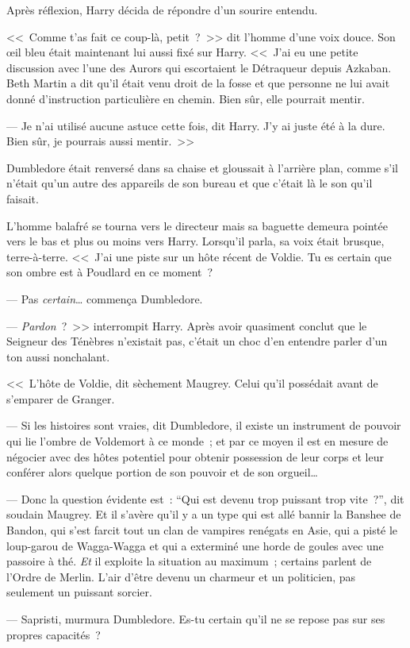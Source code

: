 Après réflexion, Harry décida de répondre d'un sourire entendu.

<<~Comme t'as fait ce coup-là, petit~?~>> dit l'homme d'une voix douce. Son œil bleu était maintenant lui aussi fixé sur Harry. <<~J'ai eu une petite discussion avec l'une des Aurors qui escortaient le Détraqueur depuis Azkaban. Beth Martin a dit qu'il était venu droit de la fosse et que personne ne lui avait donné d'instruction particulière en chemin. Bien sûr, elle pourrait mentir.

--- Je n'ai utilisé aucune astuce cette fois, dit Harry. J'y ai juste été à la dure. Bien sûr, je pourrais aussi mentir.~>>

Dumbledore était renversé dans sa chaise et gloussait à l'arrière plan, comme s'il n'était qu'un autre des appareils de son bureau et que c'était là le son qu'il faisait.

L'homme balafré se tourna vers le directeur mais sa baguette demeura pointée vers le bas et plus ou moins vers Harry. Lorsqu'il parla, sa voix était brusque, terre-à-terre. <<~J'ai une piste sur un hôte récent de Voldie. Tu es certain que son ombre est à Poudlard en ce moment~?

--- Pas \emph{certain}… commença Dumbledore.

--- \emph{Pardon}~?~>> interrompit Harry. Après avoir quasiment conclut que le Seigneur des Ténèbres n'existait pas, c'était un choc d'en entendre parler d'un ton aussi nonchalant.

<<~L'hôte de Voldie, dit sèchement Maugrey. Celui qu'il possédait avant de s'emparer de Granger.

--- Si les histoires sont vraies, dit Dumbledore, il existe un instrument de pouvoir qui lie l'ombre de Voldemort à ce monde~; et par ce moyen il est en mesure de négocier avec des hôtes potentiel pour obtenir possession de leur corps et leur conférer alors quelque portion de son pouvoir et de son orgueil…

--- Donc la question évidente est~: “Qui est devenu trop puissant trop vite~?”, dit soudain Maugrey. Et il s'avère qu'il y a un type qui est allé bannir la Banshee de Bandon, qui s'est farcit tout un clan de vampires renégats en Asie, qui a pisté le loup-garou de Wagga-Wagga et qui a exterminé une horde de goules avec une passoire à thé. \emph{Et} il exploite la situation au maximum~; certains parlent de l'Ordre de Merlin. L'air d'être devenu un charmeur et un politicien, pas seulement un puissant sorcier.

--- Sapristi, murmura Dumbledore. Es-tu certain qu'il ne se repose pas sur ses propres capacités~?

